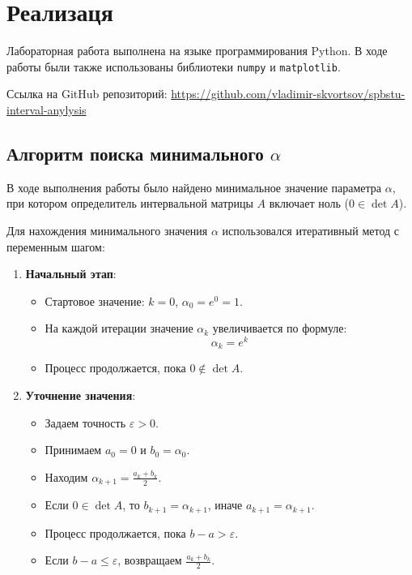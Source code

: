 \documentclass{article}
\begin{document}
  \section{Реализаця}

  Лабораторная работа выполнена на языке программирования Python. В ходе
  работы были также использованы библиотеки \verb!numpy! и
  \verb!matplotlib!.

  Ссылка на GitHub репозиторий:
  \href{https://github.com/vladimir-skvortsov/spbstu-interval-anylysis}{https://github.com/vladimir-skvortsov/spbstu-interval-anylysis}

  \subsection{Алгоритм поиска минимального \( \alpha \)}

  В ходе выполнения работы было найдено минимальное значение параметра
  \( \alpha \), при котором определитель интервальной матрицы \( A \)
  включает ноль (\( 0 \in \det A \)).

  Для нахождения минимального значения \(\alpha\) использовался
  итеративный метод с переменным шагом:

  \begin{enumerate}
    \item \textbf{Начальный этап}:
      \begin{itemize}
        \item Стартовое значение: \( k = 0 \), \(\alpha_0 = e^0 = 1\).
        \item На каждой итерации значение \( \alpha_k \) увеличивается по формуле:
          \[ \alpha_{k} = e^{k} \]
        \item Процесс продолжается, пока \( 0 \notin \det A \).
      \end{itemize}

    \item \textbf{Уточнение значения}:
      \begin{itemize}
        \item Задаем точность \( \varepsilon > 0 \).
        \item Принимаем \( a_0 = 0 \) и \( b_0 = \alpha_0 \).
        \item Находим \( \alpha_{k+1} = \frac{a_k + b_k}{2} \).
        \item Если \( 0 \in \det A \), то \( b_{k+1} = \alpha_{k+1} \),
          иначе \( a_{k+1} = \alpha_{k+1} \).
        \item Процесс продолжается, пока \( b - a > \varepsilon \).
        \item Если \( b - a \leqslant \varepsilon \), возвращаем
          \( \frac{a_k + b_k}{2} \).
      \end{itemize}
  \end{enumerate}
\end{document}
